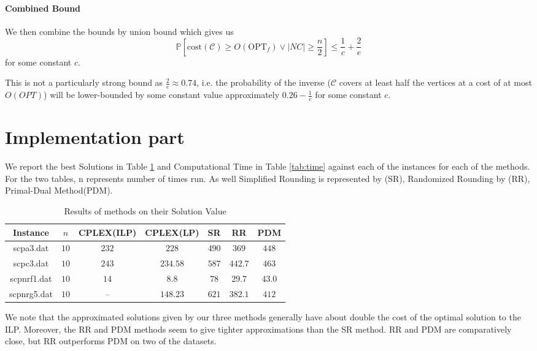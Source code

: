 \documentclass[11pt,a4paper,english]{article}
\newcommand{\PP}{\mathbb{P}}      %
\begin{document}
\paragraph{Combined Bound}
We then combine the bounds by union bound which gives us
$$\PP\left[\mathrm{cost}(\mathcal{C}) \geq O(\mathrm{OPT}_f) \vee  |NC| \geq \frac{n}{2} \right]
\leq \frac{1}{c} + \frac{2}{e}$$
for some constant $c$.

This is not a particularly strong bound as $\frac{2}{e} \approx 0.74$, i.e. the probability of the inverse ($\mathcal{C}$ covers at least half the vertices at a cost of at most $O(OPT)$) will be lower-bounded by some constant value approximately $0.26 - \frac{1}{c}$ for some constant $c$.

\clearpage


\section{Implementation part}

We report the best Solutions in Table \ref{tab:res} and Computational Time in Table \ref{tab:time} against each of the instances for each of the methods. For the two tables, n represents number of times run. As well Simplified Rounding is represented by (SR), Randomized Rounding by (RR), Primal-Dual Method(PDM).

\begin{table}[h!]
  \centering
  \begin{tabular}{|c|c|c|c|c|c|c|}\hline
    Instance& $n$& CPLEX(ILP)&CPLEX(LP)&SR&RR&PDM  \\\hline
    scpa3.dat &$10$&$232$ & $228$ & $490$& $369$ & $448$  \\
    scpc3.dat &$10$&$243$ & $234.58$ & $587$& $442.7$ & $463$ \\
    scpnrf1.dat &$10$&$14$ & $8.8$ & $78$& $29.7$ & $43.0$  \\
    scpnrg5.dat &$10$&-- & $148.23$ & $621$& $382.1$ & $412$  \\\hline
  \end{tabular}
  \caption{Results of methods on their Solution Value}
  \label{tab:res}
\end{table}

We note that the approximated solutions given by our three methods generally have about double the cost of the optimal solution to the ILP.
Moreover, the RR and PDM methods seem to give tighter approximations than the SR method. RR and PDM are comparatively close, but RR outperforms PDM
on two of the datasets.
\end{document}
